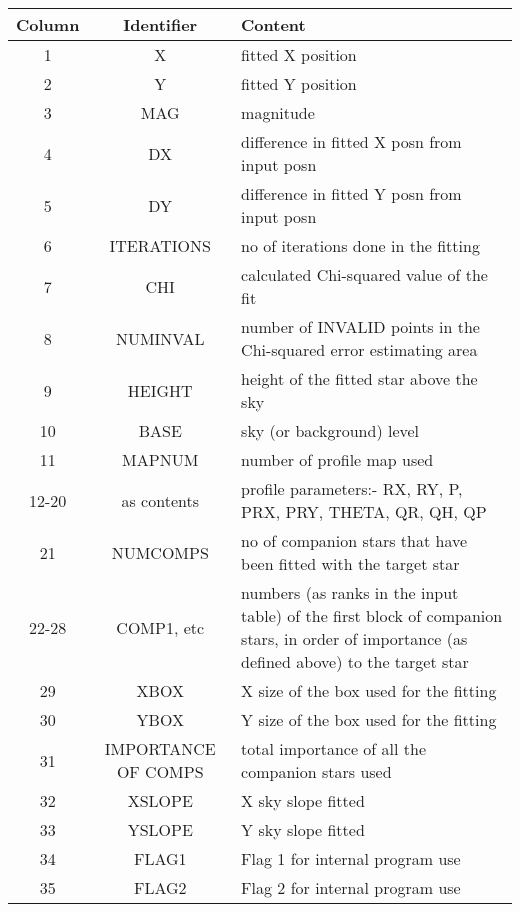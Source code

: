 \begin{small}
{{\begin{tabular}{|c|c|p{2.8in}|}\hline
   Column & Identifier &   Content \\ \hline
     1    &   X        &   fitted X position \\
     2    &   Y        &   fitted Y position  \\
     3    &   MAG      &   magnitude \\
     4    &   DX       &   difference in fitted X posn from input posn \\
     5    &   DY        &  difference in fitted Y posn from input posn \\
     6    &   ITERATIONS&  no of iterations done in the fitting \\
     7    &   CHI       &  calculated Chi-squared value of the fit \\
     8    &   NUMINVAL  &  number of INVALID points in the Chi-squared
                         error estimating area \\
     9    &   HEIGHT    &  height of the fitted star above the sky \\
    10    &   BASE      &  sky (or background) level \\
    11    &   MAPNUM    &  number of profile map used \\
    12-20 &   as contents & profile parameters:-  RX, RY, P, PRX, PRY, THETA,
        QR, QH, QP \\ 
    21    &   NUMCOMPS  &  no of companion stars that have been fitted with the
                         target star \\
    22-28 &   COMP1, etc & numbers (as ranks in the input table) of the
                         first block of companion stars, in order of
                         importance (as defined above) to the target star \\
    29    &   XBOX    &    X size of the box used for the fitting \\
    30    &   YBOX     &   Y size of the box used for the fitting \\ 
    31    &   IMPORTANCE OF COMPS & total importance of all the companion stars used \\
    32    &   XSLOPE    &  X sky slope fitted \\
    33    &   YSLOPE    &  Y sky slope fitted  \\
    34    &   FLAG1     &  Flag 1 for internal program use \\
    35    &   FLAG2     &  Flag 2 for internal program use \\

\end{tabular}}}
\end{small}
